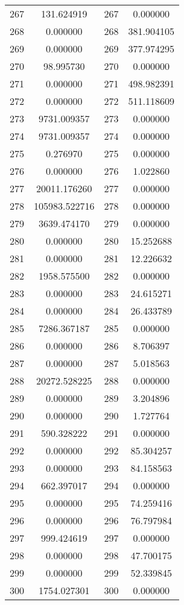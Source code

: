 \documentclass[12pt]{article}
\begin{document}
\begin{longtable}{@{}cccc@{}}
267 & 131.624919 & 267 & 0.000000 \\
268 & 0.000000 & 268 & 381.904105 \\
269 & 0.000000 & 269 & 377.974295 \\
270 & 98.995730 & 270 & 0.000000 \\
271 & 0.000000 & 271 & 498.982391 \\
272 & 0.000000 & 272 & 511.118609 \\
273 & 9731.009357 & 273 & 0.000000 \\
274 & 9731.009357 & 274 & 0.000000 \\
275 & 0.276970 & 275 & 0.000000 \\
276 & 0.000000 & 276 & 1.022860 \\
277 & 20011.176260 & 277 & 0.000000 \\
278 & 105983.522716 & 278 & 0.000000 \\
279 & 3639.474170 & 279 & 0.000000 \\
280 & 0.000000 & 280 & 15.252688 \\
281 & 0.000000 & 281 & 12.226632 \\
282 & 1958.575500 & 282 & 0.000000 \\
283 & 0.000000 & 283 & 24.615271 \\
284 & 0.000000 & 284 & 26.433789 \\
285 & 7286.367187 & 285 & 0.000000 \\
286 & 0.000000 & 286 & 8.706397 \\
287 & 0.000000 & 287 & 5.018563 \\
288 & 20272.528225 & 288 & 0.000000 \\
289 & 0.000000 & 289 & 3.204896 \\
290 & 0.000000 & 290 & 1.727764 \\
291 & 590.328222 & 291 & 0.000000 \\
292 & 0.000000 & 292 & 85.304257 \\
293 & 0.000000 & 293 & 84.158563 \\
294 & 662.397017 & 294 & 0.000000 \\
295 & 0.000000 & 295 & 74.259416 \\
296 & 0.000000 & 296 & 76.797984 \\
297 & 999.424619 & 297 & 0.000000 \\
298 & 0.000000 & 298 & 47.700175 \\
299 & 0.000000 & 299 & 52.339845 \\
300 & 1754.027301 & 300 & 0.000000 \\

\end{longtable}
\end{document}
